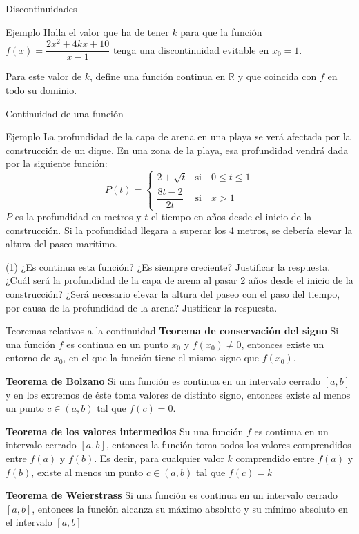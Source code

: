 \documentclass[8pt]{beamer}
\newcommand{\R}{\mathbb{R}}
\begin{document}
\begin{frame}[t]{Discontinuidades}
\begin{exampleblock}{Ejemplo}
Halla el valor que ha de tener $k$ para que la función $f(x)=\dfrac{2x^2+4kx+10}{x-1}$ tenga una discontinuidad evitable en $x_0=1$.

Para este valor de $k$, define una función continua en $\R$ y que coincida con $f$ en todo su dominio.
\end{exampleblock}
\end{frame}

\begin{frame}[t]{Continuidad de una función}
\begin{exampleblock}{Ejemplo}
La profundidad de la capa de arena en una playa se verá afectada por la construcción de un dique. En una zona de la playa, esa profundidad vendrá dada por la siguiente función: 
\[ P(t)= \begin{cases} 2+ \sqrt{t} & \text{si} \quad 0 \leq t \leq 1 \\ \dfrac{8t-2}{2t} & \text{si} \quad x> 1 \end{cases} \]
$P$ es la profundidad en metros y $t$ el tiempo en años desde el inicio de la construcción. Si la profundidad llegara a superar los 4 metros, se debería elevar la altura del paseo marítimo.
\begin{tasks}[label=\alph*)](1)
\task ¿Es continua esta función? ¿Es siempre creciente? Justificar la respuesta.
\task ¿Cuál será la profundidad de la capa de arena al pasar 2 años desde el inicio de la construcción?
\task ¿Será necesario elevar la altura del paseo con el paso del tiempo, por causa de la profundidad de la arena? Justificar la respuesta.

\end{tasks}
\end{exampleblock}
\end{frame}


\begin{frame}[t]{Teoremas relativos a la continuidad}
\textbf{Teorema de conservación del signo}
Si una función $f$ es continua en un punto $x_0$ y $f(x_0) \neq 0$, entonces existe un entorno de $x_0$, en el que la función tiene el mismo signo que $f(x_0)$.

\pause
\textbf{Teorema de Bolzano}
Si una función es continua en un intervalo cerrado $[a,b]$ y en los extremos de éste toma valores de distinto signo, entonces existe al menos un punto $c\in(a,b)$ tal que $f(c)=0$.

\pause
\textbf{Teorema de los valores intermedios}
Su una función $f$ es continua en un intervalo cerrado $[a,b]$, entonces la función toma todos los valores comprendidos entre $f(a)$ y $f(b)$. Es decir, para cualquier valor $k$ comprendido entre $f(a)$ y $f(b)$, existe al menos un punto $c \in (a,b)$ tal que $f(c)=k$

\pause
\textbf{Teorema de Weierstrass}
Si una función es continua en un intervalo cerrado $[a,b]$, entonces la función alcanza su máximo absoluto y su mínimo absoluto en el intervalo $[a,b]$
\end{frame}
\end{document}
